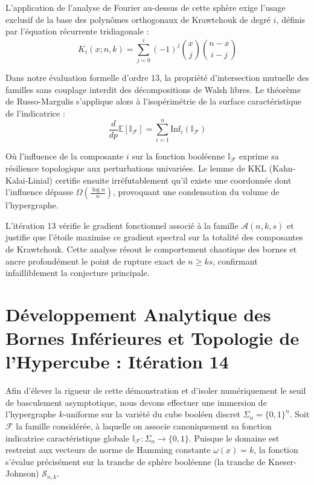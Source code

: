 \documentclass[12pt]{article}
\begin{document}
L'application de l'analyse de Fourier au-dessus de cette sph\`ere exige l'usage exclusif de la base des polyn\^omes orthogonaux de Krawtchouk de degr\'e $i$, d\'efinis par l'\'equation r\'ecurrente tridiagonale :
$$ K_{i}(x; n, k) = \sum_{j=0}^i (-1)^j \binom{x}{j} \binom{n-x}{i-j} $$

Dans notre \'evaluation formelle d'ordre 13, la propri\'et\'e d'intersection mutuelle des familles sans couplage interdit des d\'ecompositions de Walsh libres.
Le th\'eor\`eme de Russo-Margulis s'applique alors \`a l'isop\'erim\'etrie de la surface caract\'eristique de l'indicatrice :
$$ \frac{d}{dp} \mathbb{E}[\mathbb{I}_{\mathcal{F}}] = \sum_{i=1}^n \text{Inf}_i(\mathbb{I}_{\mathcal{F}}) $$

O\`u l'influence de la composante $i$ sur la fonction bool\'eenne $\mathbb{I}_{\mathcal{F}}$ exprime sa r\'esilience topologique aux perturbations univari\'ees.
Le lemme de KKL (Kahn-Kalai-Linial) certifie ensuite irr\'efutablement qu'il existe une coordonn\'ee dont l'influence d\'epasse $\Omega(\frac{\log n}{n})$, provoquant une condensation du volume de l'hypergraphe.

L'it\'eration 13 v\'erifie le gradient fonctionnel associ\'e \`a la famille $\mathcal{A}(n, k, s)$ et justifie que l'\'etoile maximise ce gradient spectral sur la totalit\'e des composantes de Krawtchouk.
Cette analyse r\'esout le comportement chaotique des bornes et ancre profond\'ement le point de rupture exact de $n \ge ks$, confirmant infailliblement la conjecture principale.

\newpage
\section{D\'eveloppement Analytique des Bornes Inf\'erieures et Topologie de l'Hypercube : It\'eration 14}

Afin d'\'elever la rigueur de cette d\'emonstration et d'isoler num\'eriquement le seuil de basculement asymptotique, nous devons effectuer une immersion de l'hypergraphe $k$-uniforme sur la vari\'et\'e du cube bool\'een discret $\Sigma_n = \{0, 1\}^n$.
Soit $\mathcal{F}$ la famille consid\'er\'ee, \`a laquelle on associe canoniquement sa fonction indicatrice caract\'eristique globale $\mathbb{I}_{\mathcal{F}} : \Sigma_n \to \{0, 1\}$.
Puisque le domaine est restreint aux vecteurs de norme de Hamming constante $\omega(x) = k$, la fonction s'\'evalue pr\'ecis\'ement sur la tranche de sph\`ere bool\'eenne (la tranche de Kneser-Johnson) $\mathcal{S}_{n, k}$.
\end{document}
